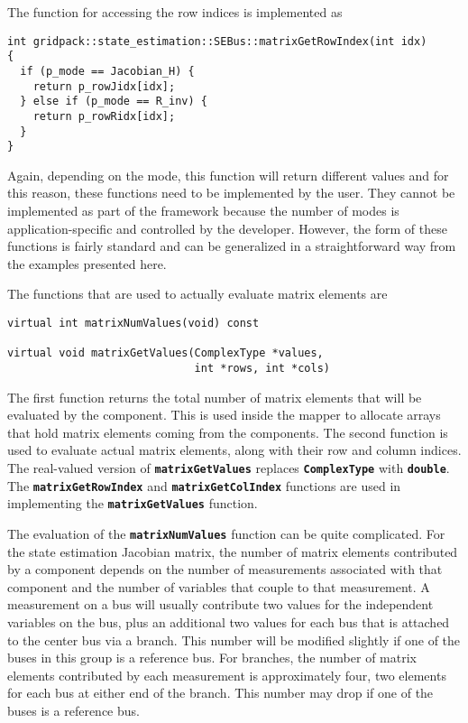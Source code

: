 The function for accessing the row indices is implemented as

{
\color{red}
\begin{Verbatim}[fontseries=b]
int gridpack::state_estimation::SEBus::matrixGetRowIndex(int idx)
{
  if (p_mode == Jacobian_H) {
    return p_rowJidx[idx];
  } else if (p_mode == R_inv) {
    return p_rowRidx[idx];
  }
}
\end{Verbatim}
}

Again, depending on the mode, this function will return different values and for
this reason, these functions need to be implemented by the user. They cannot be
implemented as part of the framework because the number of modes is
application-specific and controlled by the developer. However, the form of these
functions is fairly standard and can be generalized in a straightforward way
from the examples presented here.

The functions that are used to actually evaluate matrix elements are

{
\color{red}
\begin{Verbatim}[fontseries=b]
virtual int matrixNumValues(void) const

virtual void matrixGetValues(ComplexType *values,
                             int *rows, int *cols)
\end{Verbatim}
}

The first function returns the total number of matrix elements that will be
evaluated by the component. This is used inside the mapper to allocate arrays
that hold matrix elements coming from the components. The second function is
used to evaluate actual matrix elements, along with their row and column
indices. The real-valued version of \texttt{\textbf{matrixGetValues}} replaces
\texttt{\textbf{ComplexType}} with \texttt{\textbf{double}}.
The \texttt{\textbf{matrixGetRowIndex}} and \texttt{\textbf{matrixGetColIndex}}
functions are used in implementing the \texttt{\textbf{matrixGetValues}} function.

The evaluation of the \texttt{\textbf{matrixNumValues}} function can be quite complicated. For the state estimation Jacobian matrix, the number of matrix elements contributed by a component depends on the number of measurements associated with that component and the number of variables that couple to that measurement. A measurement on a bus will usually contribute two values for the independent variables on the bus, plus an additional two values for each bus that is attached to the center bus via a branch. This number will be modified slightly if one of the buses in this group is a reference bus. For branches, the number of matrix elements contributed by each measurement is approximately four, two elements for each bus at either end of the branch. This number may drop if one of the buses is a reference bus.

